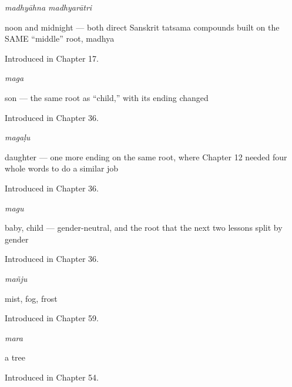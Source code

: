 \noindent\begin{minipage}[t]{\linewidth}
\raggedright
\textbf{ }\enspace\emph{madhyāhna madhyarātri}\par
\small noon and midnight — both direct Sanskrit tatsama compounds built on the SAME \textquotedblleft{}middle\textquotedblright{} root, madhya\par
\footnotesize Introduced in Chapter 17.
\end{minipage}\par\medskip

\noindent\begin{minipage}[t]{\linewidth}
\raggedright
\textbf{}\enspace\emph{maga}\par
\small son — the same root as \textquotedblleft{}child,\textquotedblright{} with its ending changed\par
\footnotesize Introduced in Chapter 36.
\end{minipage}\par\medskip

\noindent\begin{minipage}[t]{\linewidth}
\raggedright
\textbf{}\enspace\emph{magaḷu}\par
\small daughter — one more ending on the same root, where Chapter 12 needed four whole words to do a similar job\par
\footnotesize Introduced in Chapter 36.
\end{minipage}\par\medskip

\noindent\begin{minipage}[t]{\linewidth}
\raggedright
\textbf{}\enspace\emph{magu}\par
\small baby, child — gender-neutral, and the root that the next two lessons split by gender\par
\footnotesize Introduced in Chapter 36.
\end{minipage}\par\medskip

\noindent\begin{minipage}[t]{\linewidth}
\raggedright
\textbf{}\enspace\emph{mañju}\par
\small mist, fog, frost\par
\footnotesize Introduced in Chapter 59.
\end{minipage}\par\medskip

\noindent\begin{minipage}[t]{\linewidth}
\raggedright
\textbf{}\enspace\emph{mara}\par
\small a tree\par
\footnotesize Introduced in Chapter 54.
\end{minipage}\par\medskip

